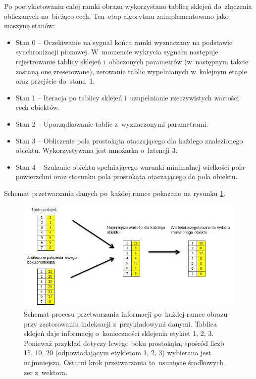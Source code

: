 Po poetykietowaniu całej ramki obrazu wykorzystano tablicę sklejeń do~złączenia obliczanych na~bieżąco cech. 
Ten~etap algorytmu zaimplementowano jako maszynę stanów:
\begin{itemize}
	\item Stan 0 -- Oczekiwanie na sygnał końca ramki wyznaczany na podstawie synchronizacji pionowej. W~momencie wykrycia sygnału następuje rejestrowanie tablicy sklejeń i~obliczonych parametrów (w~następnym takcie zostaną one zresetowane), zerowanie tablic wypełnianych w~kolejnym etapie oraz przejście do~stanu~1. 
	\item Stan 1 -- Iteracja po tablicy sklejeń i~uzupełnianie rzeczywistych wartości cech obiektów.
	\item Stan 2 -- Uporządkowanie tablic z~wyznaczonymi parametrami.
	\item Stan 3 -- Obliczenie pola prostokąta otaczającego dla każdego znalezionego obiektu. Wykorzystywana jest mnożarka o~latencji 3.
	\item Stan 4 -- Szukanie obiektu spełniającego warunki minimalnej wielkości pola powierzchni oraz stosunku pola prostokąta otaczającego do pola obiektu.
\end{itemize}
Schemat przetwarzania danych po~każdej ramce pokazano na rysunku \ref{fig:ind_schemat}.
\begin{figure}[h]
	\centering
	\includegraphics[width=\textwidth]{ind_schemat.jpg}
	\caption{Schemat procesu przetwarzania informacji po~każdej ramce obrazu przy zastosowaniu indeksacji z~przykładowymi danymi. Tablica sklejeń daje informację o~konieczności sklejenia etykiet 1, 2, 3. Ponieważ przykład dotyczy lewego boku prostokąta, spośród liczb 15, 10, 20 (odpowiadającym etykietom 1, 2, 3) wybierana jest najmniejsza. Ostatni krok przetwarzania to~usunięcie środkowych zer z~wektora.}
	\label{fig:ind_schemat}
\end{figure}


